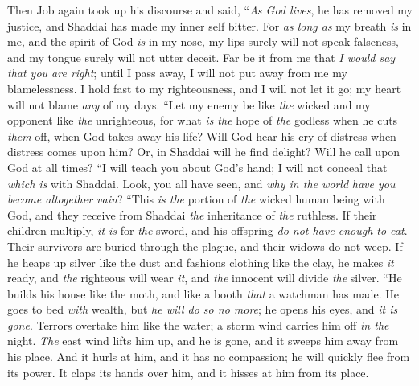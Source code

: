 \begin{biblechapter} %
 Then Job again took up his discourse and said,
\verse “\textit{As God lives}, he has removed my justice, 
and Shaddai has made my inner self bitter.
\verse For \textit{as long as} my breath \textit{is} in me, 
and the spirit of God \textit{is} in my nose,
\verse my lips surely will not speak falseness, 
and my tongue surely will not utter deceit.
\verse Far be it from me that \textit{I would say that you are right}; 
until I pass away, I will not put away from me my blamelessness.
\verse I hold fast to my righteousness, and I will not let it go; 
my heart will not blame \textit{any} of my days.
\verse “Let my enemy be like \textit{the} wicked 
and my opponent like \textit{the} unrighteous,
\verse for what \textit{is the} hope of \textit{the} godless when he cuts \textit{them} off, 
when God takes away his life?
\verse Will God hear his cry of distress 
when distress comes upon him?
\verse Or, in Shaddai will he find delight? 
Will he call upon God at all times?
\verse “I will teach you about God’s hand; 
I will not conceal that \textit{which is} with Shaddai.
\verse Look, you all have seen, 
and \textit{why in the world} \textit{have you become altogether vain}?
\verse “This \textit{is the} portion of \textit{the} wicked human being with God, 
and they receive from Shaddai \textit{the} inheritance of \textit{the} ruthless.
\verse If their children multiply, \textit{it is} for \textit{the} sword, 
and his offspring \textit{do not have enough to eat}.
\verse Their survivors are buried through the plague, 
and their widows do not weep.
\verse If he heaps up silver like the dust 
and fashions clothing like the clay,
\verse he makes \textit{it} ready, and \textit{the} righteous will wear \textit{it}, 
and \textit{the} innocent will divide \textit{the} silver.
\verse “He builds his house like the moth, 
and like a booth \textit{that} a watchman has made.
\verse He goes to bed \textit{with} wealth, but \textit{he will do so no more}; 
he opens his eyes, and \textit{it is gone}.
\verse Terrors overtake him like the water; 
a storm wind carries him off \textit{in the} night.
\verse \textit{The} east wind lifts him up, and he is gone, 
and it sweeps him away from his place.
\verse And it hurls at him, and it has no compassion; 
he will quickly flee from its power.
\verse It claps its hands over him, 
and it hisses at him from its place.
\end{biblechapter}

